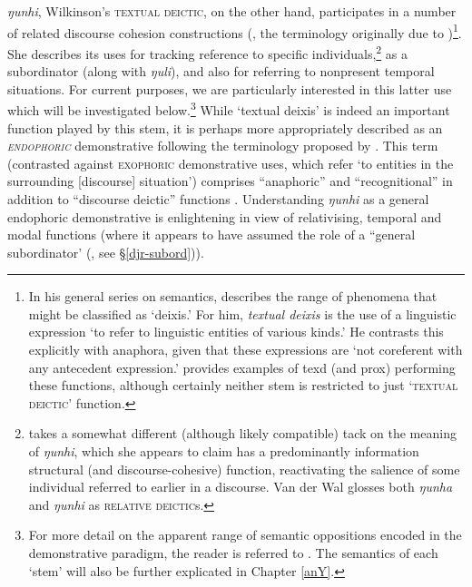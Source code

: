 \textit{ŋunhi}, Wilkinson's \textsc{textual deictic}, on the other hand, participates in a number of related discourse cohesion constructions (\citealp[254]{Wilkinson1991}, the terminology originally due to \citealp[667]{Lyons1977})\footnote{In his general series on semantics, \citet[667\textit{ff}]{Lyons1977} describes the range of phenomena that might be classified as `deixis.' For him, \textsl{textual deixis} is the use of a linguistic expression `to refer to linguistic entities of various kinds.' He contrasts this explicitly with anaphora, given that these expressions are `not coreferent with any antecedent expression.' \citet[266]{Wilkinson1991} provides examples of \gls{texd} (and \gls{prox}) performing these functions, although certainly neither stem is restricted to just `\textsc{textual deictic}' function.}. She describes its uses for tracking reference to specific individuals,\footnote{ takes a somewhat different (although likely compatible) tack on the meaning of \textit{ŋunhi}, which she appears to claim has a predominantly information structural (and discourse-cohesive) function, reactivating the salience of some individual referred to earlier in a discourse. Van der Wal glosses both \textit{ŋunha} and \textit{ŋunhi} as \textsc{relative deictic}s.} as a subordinator (along with \textit{ŋuli}), and also for referring to nonpresent temporal situations. For current purposes, we are particularly interested in this latter use which will be investigated below.\footnote{For more detail on the apparent range of semantic oppositions encoded in the demonstrative paradigm, the reader is referred to \citealp[288]{Wilkinson1991}. The semantics of each `stem' will also be further explicated in Chapter \ref{anY}.} While `textual deixis' is indeed an important function played by this stem, it is perhaps more appropriately described as an \textsc{\textit{endophoric}} demonstrative following the terminology proposed by \citet{Halliday1976}. This term (contrasted against \textsc{exophoric} demonstrative uses, which refer `to entities in the surrounding [discourse] situation') comprises ``anaphoric'' and ``recognitional'' in addition to ``discourse deictic'' functions \citep[6\textit{ff}]{Diessel1999}. Understanding \textit{ŋunhi} as a general endophoric demonstrative is enlightening in view of relativising, temporal and modal functions (where it appears to have assumed the role of a ``general subordinator' (\citealp[i.e.][656]{Wilkinson1991}, see §\ref{djr-subord})).

